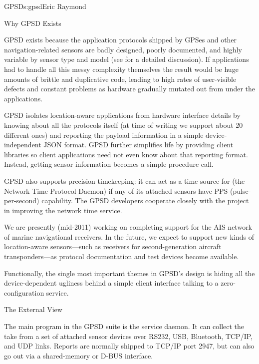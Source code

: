 \begin{aosachapter}{GPSD}{s:gpsd}{Eric Raymond}

\begin{aosasect1}{Why GPSD Exists}

GPSD exists because the application protocols shipped by GPSes and
other navigation-related sensors are badly designed, poorly
documented, and highly variable by sensor type and model (see
\cite{bib:gps-suck} for a detailed discussion). If applications had to
handle all this messy complexity themselves the result would be huge
amounts of brittle and duplicative code, leading to high rates of
user-visible defects and constant problems as hardware gradually
mutated out from under the applications.

GPSD isolates location-aware applications from hardware interface
details by knowing about all the protocols itself (at time of writing
we support about 20 different ones) and reporting the payload
information in a simple device-independent JSON format.  GPSD further
simplifies life by providing client libraries so client applications
need not even know about that reporting format.  Instead, getting
sensor information becomes a simple procedure call.

GPSD also supports precision timekeeping: it can act as a time source
for  (the Network Time Protocol Daemon) if any of its
attached sensors have PPS (pulse-per-second) capability. The GPSD
developers cooperate closely with the  project in improving
the network time service.

We are presently (mid-2011) working on completing support for the AIS
network of marine navigational receivers.  In the future, we expect to
support new kinds of location-aware sensors---such as receivers for
second-generation aircraft transponders---as protocol documentation
and test devices become available.

Functionally, the single most important themes in GPSD's design is
hiding all the device-dependent ugliness behind a simple client
interface talking to a zero-configuration service.


\end{aosasect1}

\begin{aosasect1}{The External View}

The main program in the GPSD suite is the  service daemon.
It can collect the take from a set of attached sensor devices over
RS232, USB, Bluetooth, TCP/IP, and UDP links. Reports are normally
shipped to TCP/IP port 2947, but can also go out via a shared-memory
or D-BUS interface.


\end{aosasect1}
\end{aosachapter}
